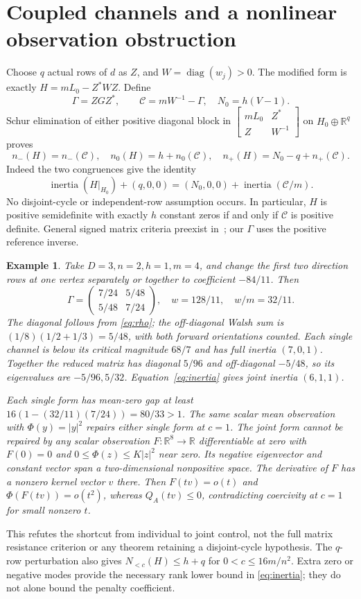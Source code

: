 \documentclass[11pt,a4paper]{article}
\newtheorem{example}[theorem]{Example}
\newcommand{\R}{\mathbb R}
\newcommand{\Nlow}{N_{<c}}
\DeclareMathOperator{\diag}{diag}
\begin{document}
\section{Coupled channels and a nonlinear observation obstruction}
Choose $q$ actual rows of $d$ as $Z$, and $W=\diag(w_j)>0$. The modified
form is exactly $H=mL_0-Z^*WZ$. Define
\[
 \Gamma=ZGZ^*,\qquad \mathcal C=mW^{-1}-\Gamma,\quad N_0=h(V-1).
\]
Schur elimination of either positive diagonal block in
$\left[\begin{smallmatrix}mL_0&Z^*\\Z&W^{-1}\end{smallmatrix}\right]$
on $H_0\oplus\R^q$ proves
\begin{equation}\label{eq:inertia}
 n_-(H)=n_-(\mathcal C),\quad n_0(H)=h+n_0(\mathcal C),\quad
 n_+(H)=N_0-q+n_+(\mathcal C).
\end{equation}
Indeed the two congruences give the identity
\[
 \operatorname{inertia}(H|_{H_0})+(q,0,0)
 = (N_0,0,0)+\operatorname{inertia}(\mathcal C/m).
\]
No disjoint-cycle or independent-row assumption occurs. In particular,
$H$ is positive semidefinite with exactly $h$ constant zeros if and only if
$\mathcal C$ is positive definite. General signed matrix criteria preexist
in~\cite{Chen}; our $\Gamma$ uses the positive reference inverse.

\begin{example}\label{ex:coupled}
Take $D=3,n=2,h=1,m=4$, and change the first two direction rows at one
vertex separately or together to coefficient $-84/11$. Then
\[
 \Gamma=\begin{pmatrix}7/24&5/48\\5/48&7/24\end{pmatrix},
 \quad w=128/11,\quad w/m=32/11.
\]
The diagonal follows from \eqref{eq:rho}; the off-diagonal Walsh sum is
$(1/8)(1/2+1/3)=5/48$, with both forward orientations counted.
Each single channel is below its critical magnitude $68/7$ and has full
inertia $(7,0,1)$. Together the reduced matrix has diagonal $5/96$ and
off-diagonal $-5/48$, so its eigenvalues are $-5/96,5/32$.
Equation~\eqref{eq:inertia} gives joint inertia $(6,1,1)$.

Each single form has mean-zero gap at least
$16(1-(32/11)(7/24))=80/33>1$. The same scalar mean observation with
$\Phi(y)=|y|^2$ repairs either single form at $c=1$. The joint form cannot
be repaired by any scalar observation $F:\R^8\to\R$ differentiable at zero
with $F(0)=0$ and $0\leq\Phi(z)\leq K|z|^2$ near zero. Its negative
eigenvector and constant vector span a two-dimensional nonpositive space.
The derivative of $F$ has a nonzero kernel vector $v$ there. Then
$F(tv)=o(t)$ and $\Phi(F(tv))=o(t^2)$, whereas $Q_A(tv)\leq0$, contradicting
coercivity at $c=1$ for small nonzero $t$.
\end{example}
This refutes the shortcut from individual to joint control, not the full
matrix resistance criterion or any theorem retaining a disjoint-cycle
hypothesis. The $q$-row perturbation also gives
$\Nlow(H)\leq h+q$ for $0<c\leq16m/n^2$. Extra zero or negative modes
provide the necessary rank lower bound in \eqref{eq:inertia}; they do not
alone bound the penalty coefficient.
\end{document}
